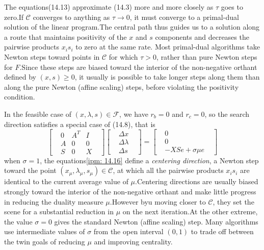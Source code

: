 The equations(14.13) approximate (14.3) more and more closely as $\tau$ goes to zero.If $\mathcal{C}$ converges
to anything as $ \tau \xrightarrow{ }  0$, it must converge to a primal-dual solution of the linear program.The central path
thus guides us to a solution along a route that maintains positivity of the $x$ and $s$ components and decreases the pairwise products $x_i s_i$ to zero at the same rate.
Most primal-dual algorithms take Newton steps toward points in $\mathcal{C}$ for which $\tau > 0$, rather than pure
Newton steps for $F$.Since these steps are biased toward the interior of the non-negative orthant defined by $(x, s)\geq 0$,
it usually is possible to take longer steps along them than along the pure Newton (affine scaling) steps, before violating the
positivity condition.
\par In the feasible case of $(x, \lambda, s)\in\mathcal{F} $, we have $r_b = 0$ and $r_c = 0$, so the search direction
satisfies a special case of (14.8), that is
\[
    \begin{bmatrix}
        & 0 & A^T & I & \\
        & A & 0 & 0 & \\
        & S & 0 & X
    \end{bmatrix}
    \begin{bmatrix}
        & \Delta x &\\
        & \Delta \lambda & \\
        & \Delta s &
    \end{bmatrix} =
    \begin{bmatrix}
        & 0 &\\
        & 0 & \\
        & -XSe + \sigma\mu e &
    \end{bmatrix}\tag{14.16}\label{ipm: 14.16}
\]
when $\sigma = 1 $, the equations\eqref{ipm: 14.16} define a \textit{centering direction}, a Newton step toward the point
$(x_\mu, \lambda_\mu, s_\mu)\in\mathcal{C} $, at which all the pairwise products $x_i s_i$ are identical to the current
average value of $\mu$.Centering directions are usually biased strongly toward the interior of the non-negative orthant and make little
progress in reducing the duality measure $\mu$.However byu moving closer to $\mathcal{C} $, they set the scene for a substantial
reduction in $\mu$ on the next iteration.At the other extreme, the value $\sigma = 0$ gives the standard Newton (affine scaling) step.
Many algorithms use intermediate values of $\sigma $ from the open interval $(0, 1)$ to trade off between the twin goals of
reducing $\mu$ and improving centrality.

